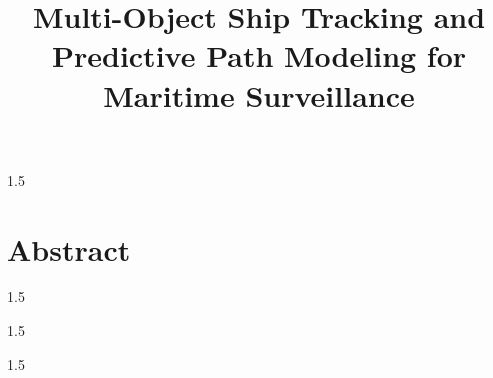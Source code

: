 \documentclass[12pt,oneside,a4paper]{book} %
\title{Multi-Object Ship Tracking and Predictive Path Modeling for Maritime Surveillance}
\begin{document}
	\NoBgThispage%
	\maketitle
	\newpage
	\ifDrf
	\else
	\begin{spacing}{1.5}
		
		
		\newpage
		
		
		\newpage
		
		
		\newpage
		
		\chapter*{Abstract}
		

		
	\end{spacing}
	\newpage
	\pagestyle{fplain}
	\begin{spacing}{1.5}
		\tableofcontents	
	\end{spacing}
	\newpage
	\begin{spacing}{1.5}
		\cleardoublepage
		\listoffigures	
	\end{spacing}
	\newpage
	\begin{spacing}{1.5}
		\cleardoublepage
		\listoftables	
	\end{spacing}
	
	\glsaddall[types=\acronymtype]
	\printglossary[type=\acronymtype, title= Abbreviations, toctitle=Abbreviations]
	
\end{document}
